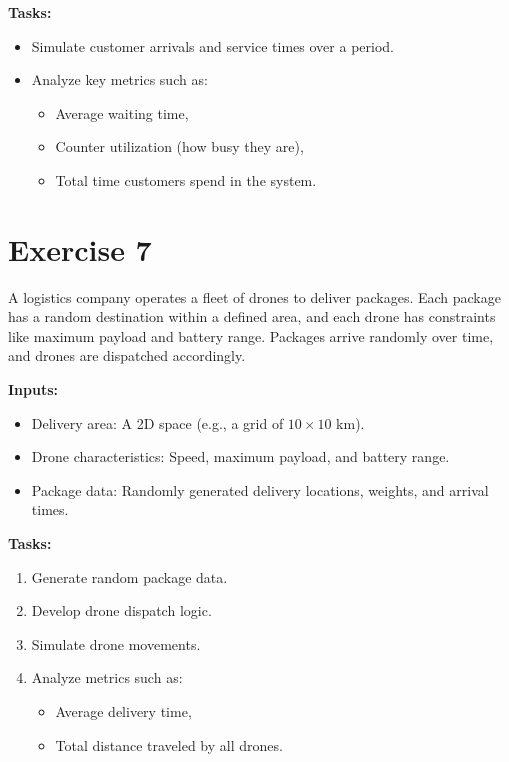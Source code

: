 \documentclass[a4paper,12pt]{article}
\begin{document}
\textbf{Tasks:}
\begin{itemize}
    \item Simulate customer arrivals and service times over a period.
    \item Analyze key metrics such as:
    \begin{itemize}
        \item Average waiting time,
        \item Counter utilization (how busy they are),
        \item Total time customers spend in the system.
    \end{itemize}
\end{itemize}

\section{Exercise 7}
A logistics company operates a fleet of drones to deliver packages. Each package has a random destination within a defined area, and each drone has constraints like maximum payload and battery range. Packages arrive randomly over time, and drones are dispatched accordingly.

\textbf{Inputs:}
\begin{itemize}
    \item Delivery area: A 2D space (e.g., a grid of $10 \times 10$ km).
    \item Drone characteristics: Speed, maximum payload, and battery range.
    \item Package data: Randomly generated delivery locations, weights, and arrival times.
\end{itemize}

\textbf{Tasks:}
\begin{enumerate}
    \item Generate random package data.
    \item Develop drone dispatch logic.
    \item Simulate drone movements.
    \item Analyze metrics such as:
    \begin{itemize}
        \item Average delivery time,
        \item Total distance traveled by all drones.
    \end{itemize}
\end{enumerate}
\end{document}
